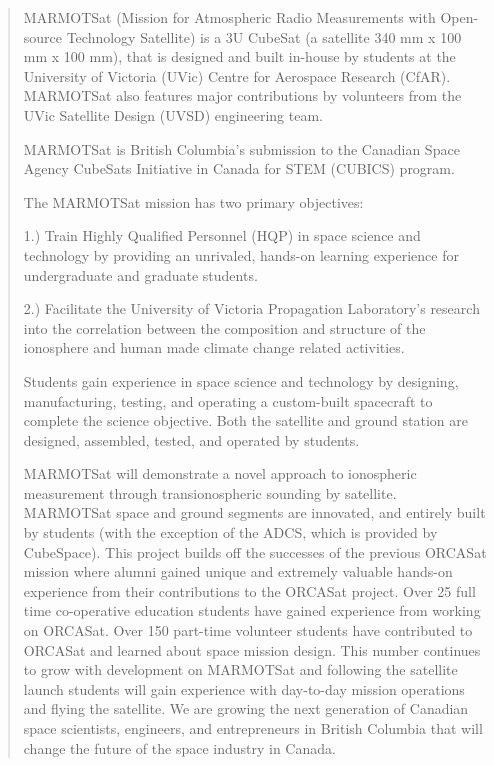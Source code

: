\begin{quote}
MARMOTSat (Mission for Atmospheric Radio Measurements with Open-source Technology Satellite) is a 3U CubeSat (a satellite 340 mm x 100 mm x 100 mm), that is designed and built in-house by students at the University of Victoria (UVic) Centre for Aerospace Research (CfAR). MARMOTSat also features major contributions by volunteers from the UVic Satellite Design (UVSD) engineering team.

MARMOTSat is British Columbia’s submission to the Canadian Space Agency CubeSats Initiative in Canada for STEM (CUBICS) program.

The MARMOTSat mission has two primary objectives:

1.) Train Highly Qualified Personnel (HQP) in space science and technology by providing an unrivaled, hands-on learning experience for undergraduate and graduate students. 

2.) Facilitate the University of Victoria Propagation Laboratory’s research into the correlation between the composition and structure of the ionosphere and human made climate change related activities.

Students gain experience in space science and technology by designing, manufacturing, testing, and operating a custom-built spacecraft to complete the science objective. Both the satellite and ground station are designed, assembled, tested, and operated by students.

MARMOTSat will demonstrate a novel approach to ionospheric measurement through transionospheric sounding by satellite. MARMOTSat space and ground segments are innovated, and entirely built by students (with the exception of the ADCS, which is provided by CubeSpace). This project builds off the successes of the previous ORCASat mission where alumni gained unique and extremely valuable hands-on experience from their contributions to the ORCASat project. Over 25 full time co-operative education students have gained experience from working on ORCASat. Over 150 part-time volunteer students have contributed to ORCASat and learned about space mission design. This number continues to grow with development on MARMOTSat and following the satellite launch students will gain experience with day-to-day mission operations and flying the satellite. We are growing the next generation of Canadian space scientists, engineers, and entrepreneurs in British Columbia that will change the future of the space industry in Canada.
\cite{marmotsat}
\end{quote}
